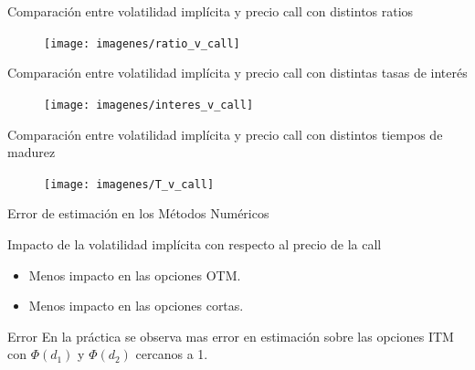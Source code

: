 \documentclass{beamer}
\begin{document}
\begin{frame}{Comparaci\'on entre volatilidad impl\'icita y precio call con distintos ratios}

  \begin{figure}[t!]
    \centering
    \texttt{[image: imagenes/ratio\_v\_call]}
    
  \end{figure}

\end{frame}

\begin{frame}{Comparaci\'on entre volatilidad impl\'icita y precio call con distintas tasas de inter\'es}

  \begin{figure}[t!]
    \centering
    \texttt{[image: imagenes/interes\_v\_call]}
  \end{figure}

\end{frame}



\begin{frame}{Comparaci\'on entre volatilidad impl\'icita y precio call con distintos tiempos de madurez}

  \begin{figure}[t!]
    \centering
    \texttt{[image: imagenes/T\_v\_call]}
  \end{figure}
\end{frame}

\begin{frame}{Error de estimaci\'on en los M\'etodos Num\'ericos}

  \begin{block}{Impacto de la volatilidad impl\'icita con respecto al precio de la call}    
    \begin{itemize}
      \item Menos impacto en las opciones OTM.
      \item Menos impacto en las opciones cortas.
    \end{itemize}
  \end{block}

  \begin{block}{Error}
    En la pr\'actica se observa mas error en estimaci\'on sobre las opciones ITM con $\Phi(d_1)$ y
    $\Phi(d_2)$ cercanos a 1.
  \end{block}

\end{frame}
\end{document}
